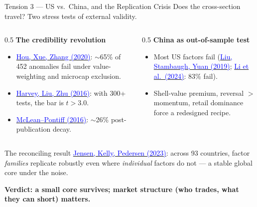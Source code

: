 \documentclass{beamer}
\begin{document}
\begin{frame}{Tension 3 --- US vs.\ China, and the Replication Crisis}
Does the cross-section travel? Two stress tests of external validity.
\begin{columns}[T]
\begin{column}{0.5\textwidth}
\textbf{The credibility revolution}
\begin{itemize}\small
  \item \href{https://doi.org/10.1093/rfs/hhy131}{\textcolor{blue}{Hou, Xue, Zhang (2020)}}: $\sim$65\% of 452 anomalies fail under value-weighting and microcap exclusion.
  \item \href{https://doi.org/10.1093/rfs/hhv059}{\textcolor{blue}{Harvey, Liu, Zhu (2016)}}: with 300+ tests, the bar is $t>3.0$.
  \item \href{https://doi.org/10.1111/jofi.12365}{\textcolor{blue}{McLean--Pontiff (2016)}}: $\sim$26\% post-publication decay.
\end{itemize}
\end{column}
\begin{column}{0.5\textwidth}
\textbf{China as out-of-sample test}
\begin{itemize}\small
  \item Most US factors fail (\href{https://doi.org/10.1016/j.jfineco.2019.03.008}{\textcolor{blue}{Liu, Stambaugh, Yuan (2019)}}; \href{https://doi.org/10.1287/mnsc.2023.4904}{\textcolor{blue}{Li et al.\ (2024)}}: $83\%$ fail).
  \item Shell-value premium, reversal $>$ momentum, retail dominance force a redesigned recipe.
\end{itemize}
\end{column}
\end{columns}
\vspace{4pt}
\begin{block}{The reconciling result}
\href{https://doi.org/10.1111/jofi.13249}{\textcolor{blue}{Jensen, Kelly, Pedersen (2023)}}: across 93 countries, factor \emph{families} replicate robustly even where \emph{individual} factors do not --- a stable global core under the noise.
\end{block}
\centerline{\textbf{Verdict: a small core survives; market structure (who trades, what they can short) matters.}}
\end{frame}
\end{document}
